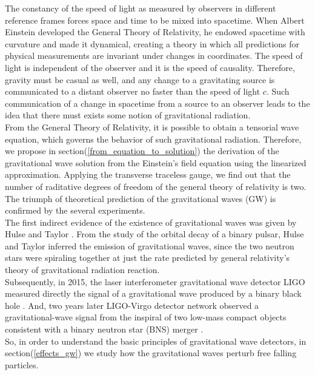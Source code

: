 The constancy of the speed of light as measured by observers in different reference frames forces space and time to be mixed into spacetime.
When Albert Einstein developed the General Theory of Relativity, he endowed spacetime with curvature and made it dynamical, creating a theory in which all predictions for physical measurements are invariant under changes in coordinates.
The speed of light is independent of the observer and it is the speed of causality.
Therefore, gravity must be casual as well, and
any change to a gravitating source is communicated to a distant observer no faster than the speed of light $c$.
Such communication of a change in spacetime from a source to an observer leads to the idea that there must exists some notion of gravitational radiation.\\
From the General Theory of Relativity, it is possible to obtain a tensorial wave equation, which governs the behavior of such gravitational radiation.
Therefore, we propose in  section(\ref{from_equation_to_solution}) the derivation of the gravitational wave solution from the Einstein's field equation using the linearized approximation.
Applying the transverse traceless gauge, we find out that the number of raditative degrees of freedom of the general theory of relativity is two.\\
The triumph of theoretical prediction of the gravitational waves (GW) is confirmed by the several experiments.\\
The first indirect evidence of the existence of gravitational waves was given by Hulse and Taylor \cite{weisberg_relativistic_2004,weisberg_timing_2010}. 
From the study of the orbital decay of a binary pulsar, Hulse and Taylor inferred the emission of gravitational waves, since the two neutron stars were spiraling together at just the rate predicted by general relativity’s theory of gravitational radiation reaction.\\
Subsequently, in 2015, the laser interferometer gravitational wave detector LIGO measured directly the signal of a gravitational wave produced by a binary black hole \cite{abbott_observation_2016}.
And, two years later LIGO-Virgo detector network observed a gravitational-wave signal from the inspiral of two low-mass compact objects consistent with a binary neutron star (BNS) merger \cite{abbott_gw170817:_2017}.\\
So, in order to understand the basic principles of gravitational wave detectors, in section(\ref{effects_gw}) we study how the gravitational waves perturb free falling particles.\\
